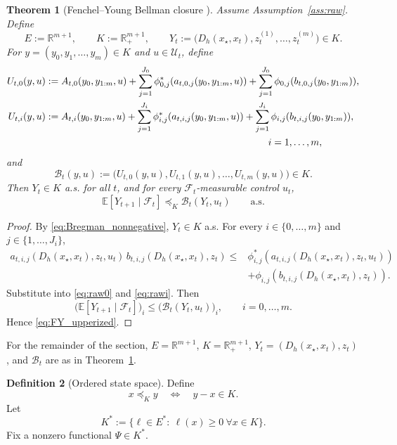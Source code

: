 \documentclass{article}
\newtheorem{theorem}{Theorem}[section]
\theoremstyle{definition}
\newtheorem{definition}[theorem]{Definition}
\begin{document}
\begin{theorem}[Fenchel--Young Bellman closure {\cite{Bellman}}]
\label{thm:FY_closure}
Assume Assumption~\ref{ass:raw}.
Define
\[
E:=\mathbb R^{m+1},
\qquad
K:=\mathbb R_+^{m+1},
\qquad
Y_t:=\bigl(D_h(x_\star,x_t),z_t^{(1)},\dots,z_t^{(m)}\bigr)\in K.
\]
For $y=(y_0,y_1,\dots,y_m)\in K$ and $u\in\mathcal U_t$, define
\begin{align*}
U_{t,0}(y,u)
&:=
A_{t,0}(y_0,y_{1:m},u)
+
\sum_{j=1}^{J_0}
\phi_{0,j}^\ast(a_{t,0,j}(y_0,y_{1:m},u))
+
\sum_{j=1}^{J_0}
\phi_{0,j}(b_{t,0,j}(y_0,y_{1:m})),
\\
U_{t,i}(y,u)
&:=
A_{t,i}(y_0,y_{1:m},u)
+
\sum_{j=1}^{J_i}
\phi_{i,j}^\ast(a_{t,i,j}(y_0,y_{1:m},u))
+
\sum_{j=1}^{J_i}
\phi_{i,j}(b_{t,i,j}(y_0,y_{1:m})),
\notag\\
&\hspace{8.1cm}
i=1,\dots,m,
\end{align*}
and
\begin{equation*}
\mathcal B_t(y,u)
:=
\bigl(U_{t,0}(y,u),U_{t,1}(y,u),\dots,U_{t,m}(y,u)\bigr)\in K.
\end{equation*}
Then $Y_t\in K$ a.s. for all $t$, and for every $\mathcal F_t$-measurable control $u_t$,
\begin{equation}
\mathbb E[Y_{t+1}\mid\mathcal F_t]
\preceq_K
\mathcal B_t(Y_t,u_t)
\qquad
\text{a.s.}
\label{eq:FY_upperized}
\end{equation}
\end{theorem}

\begin{proof}
By \eqref{eq:Bregman_nonnegative}, $Y_t\in K$ a.s.
For every $i\in\{0,\dots,m\}$ and $j\in\{1,\dots,J_i\}$,
\begin{align*}
a_{t,i,j}(D_h(x_\star,x_t),z_t,u_t)\,b_{t,i,j}(D_h(x_\star,x_t),z_t)
\le&
\phi_{i,j}^\ast(a_{t,i,j}(D_h(x_\star,x_t),z_t,u_t))\\
&+
\phi_{i,j}(b_{t,i,j}(D_h(x_\star,x_t),z_t)).
\end{align*}
Substitute into \eqref{eq:raw0} and \eqref{eq:rawi}.
Then
\[
\bigl(\mathbb E[Y_{t+1}\mid\mathcal F_t]\bigr)_i
\le
\bigl(\mathcal B_t(Y_t,u_t)\bigr)_i,
\qquad
i=0,\dots,m.
\]
Hence \eqref{eq:FY_upperized}.
\end{proof}

For the remainder of the section, $E=\mathbb R^{m+1}$, $K=\mathbb R_+^{m+1}$, $Y_t=(D_h(x_\star,x_t),z_t)$, and $\mathcal B_t$ are as in Theorem~\ref{thm:FY_closure}.

\begin{definition}[Ordered state space]
Define
\[
x\preceq_K y
\quad\Longleftrightarrow\quad
y-x\in K.
\]
Let
\[
K^\ast:=\{\ell\in E^\ast:\ \ell(x)\ge 0\ \forall x\in K\}.
\]
Fix a nonzero functional $\Psi\in K^\ast$.
\end{definition}
\end{document}
